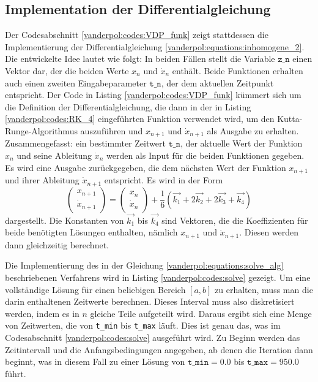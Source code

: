 \subsection{Implementation der Differentialgleichung
\label{vanderpol:subsection:diff}}
Der Codesabschnitt \ref{vanderpol:codes:VDP_funk} zeigt stattdessen die Implementierung der Differentialgleichung \eqref{vanderpol:equations:inhomogene_2}. Die entwickelte Idee lautet wie folgt: In beiden Fällen stellt die Variable $\texttt{z\_n}$ einen Vektor dar, der die beiden Werte $x_n$ und $\dot{x}_n$ enthält. Beide Funktionen erhalten auch einen zweiten Eingabeparameter $\texttt{t\_n}$, der dem aktuellen Zeitpunkt entspricht. Der Code in Listing \ref{vanderpol:codes:VDP_funk} kümmert sich um die Definition der Differentialgleichung, die dann in der in Listing \ref{vanderpol:codes:RK_4} eingeführten Funktion verwendet wird, um den Kutta-Runge-Algorithmus auszuführen und $x_{n+1}$ und $\dot{x}_{n+1}$ als Ausgabe zu erhalten. Zusammengefasst: ein bestimmter Zeitwert $\texttt{t\_n}$, der aktuelle Wert der Funktion $x_{n}$ und seine Ableitung $\dot{x}_{n}$ werden als Input für die beiden Funktionen gegeben. Es wird eine Ausgabe zurückgegeben, die dem nächsten Wert der Funktion $x_{n+1}$ und ihrer Ableitung $\dot{x}_{n+1}$ entspricht. Es wird in der Form
\begin{equation}
\begin{pmatrix}x_{n+1} \\ \dot{x}_{n+1} \end{pmatrix} = \begin{pmatrix}x_{n} \\ \dot{x}_{n} \end{pmatrix} + \frac{1}{6}(\vec{k_1} + 2\vec{k_2} + 2\vec{k_3} + \vec{k_4})
\label{vanderpol:equations:solve_alg}
\end{equation}
dargestellt. Die Konstanten von $\vec{k_1}$ bis $\vec{k_4}$ sind Vektoren, die die Koeffizienten für beide benötigten Lösungen enthalten, nämlich $x_{n+1}$ und $\dot{x}_{n+1}$.
Diesen werden dann gleichzeitig berechnet. 
 
Die Implementierung des in der Gleichung \eqref{vanderpol:equations:solve_alg} beschriebenen Verfahrens wird in Listing \ref{vanderpol:codes:solve} gezeigt. Um eine vollständige Lösung für einen beliebigen Bereich $[a, b]$ zu erhalten, muss man die darin enthaltenen Zeitwerte berechnen. Dieses Interval muss also diskretisiert werden, indem es in $n$ gleiche Teile aufgeteilt wird. Daraus ergibt sich eine Menge von Zeitwerten, die von \texttt{t\_min} bis \texttt{t\_max} läuft.
Dies ist genau das, was im Codesabschnitt \ref{vanderpol:codes:solve} ausgeführt wird. Zu Beginn werden das Zeitintervall und die Anfangsbedingungen angegeben, ab denen die Iteration dann beginnt, was in diesem Fall zu einer Lösung von $\texttt{t\_min}=0.0$ bis $\texttt{t\_max}=950.0$ führt.
